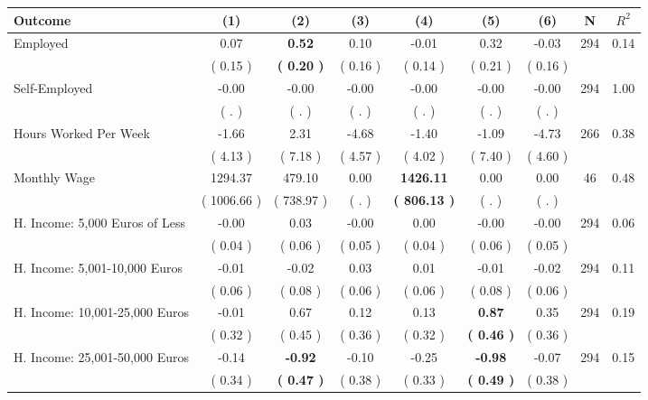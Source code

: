 \begin{tabular}{lcccccccc}
\toprule
 \textbf{Outcome} & \textbf{(1)} & \textbf{(2)} & \textbf{(3)} & \textbf{(4)} & \textbf{(5)} & \textbf{(6)} & \textbf{N} & \textbf{$ R^2$} \\
\midrule
Employed &      0.07 & \textbf{     0.52} &      0.10 &     -0.01 &      0.32 &     -0.03 & 294 &       0.14 \\ 
 & (     0.15 ) & \textbf{(     0.20 )} & (     0.16 ) & (     0.14 ) & (     0.21 ) & (     0.16 ) & \\
Self-Employed &     -0.00 &     -0.00 &     -0.00 &     -0.00 &     -0.00 &     -0.00 & 294 &       1.00 \\ 
 & (        . ) & (        . ) & (        . ) & (        . ) & (        . ) & (        . ) & \\
Hours Worked Per Week &     -1.66 &      2.31 &     -4.68 &     -1.40 &     -1.09 &     -4.73 & 266 &       0.38 \\ 
 & (     4.13 ) & (     7.18 ) & (     4.57 ) & (     4.02 ) & (     7.40 ) & (     4.60 ) & \\
Monthly Wage &   1294.37 &    479.10 &      0.00 & \textbf{  1426.11} &      0.00 &      0.00 & 46 &       0.48 \\ 
 & (  1006.66 ) & (   738.97 ) & (        . ) & \textbf{(   806.13 )} & (        . ) & (        . ) & \\
H. Income: 5,000 Euros of Less &     -0.00 &      0.03 &     -0.00 &      0.00 &     -0.00 &     -0.00 & 294 &       0.06 \\ 
 & (     0.04 ) & (     0.06 ) & (     0.05 ) & (     0.04 ) & (     0.06 ) & (     0.05 ) & \\
H. Income: 5,001-10,000 Euros &     -0.01 &     -0.02 &      0.03 &      0.01 &     -0.01 &     -0.02 & 294 &       0.11 \\ 
 & (     0.06 ) & (     0.08 ) & (     0.06 ) & (     0.06 ) & (     0.08 ) & (     0.06 ) & \\
H. Income: 10,001-25,000 Euros &     -0.01 &      0.67 &      0.12 &      0.13 & \textbf{     0.87} &      0.35 & 294 &       0.19 \\ 
 & (     0.32 ) & (     0.45 ) & (     0.36 ) & (     0.32 ) & \textbf{(     0.46 )} & (     0.36 ) & \\
H. Income: 25,001-50,000 Euros &     -0.14 & \textbf{    -0.92} &     -0.10 &     -0.25 & \textbf{    -0.98} &     -0.07 & 294 &       0.15 \\ 
 & (     0.34 ) & \textbf{(     0.47 )} & (     0.38 ) & (     0.33 ) & \textbf{(     0.49 )} & (     0.38 ) & \\

\end{tabular}
